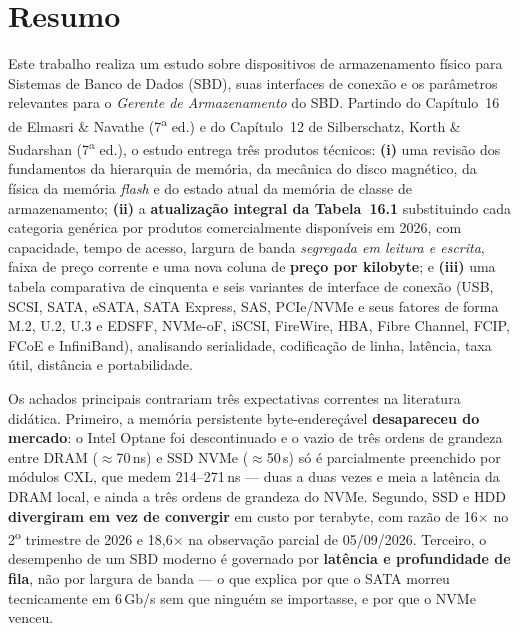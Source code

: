 \documentclass[11pt,a4paper]{article}
\begin{document}
\thispagestyle{empty}
\section*{Resumo}

Este trabalho realiza um estudo sobre dispositivos de armazenamento físico para Sistemas
de Banco de Dados (SBD), suas interfaces de conexão e os parâmetros relevantes para o
\emph{Gerente de Armazenamento} do SBD. Partindo do Capítulo~16 de Elmasri \& Navathe
(7\textsuperscript{a} ed.) e do Capítulo~12 de Silberschatz, Korth \& Sudarshan
(7\textsuperscript{a} ed.), o estudo entrega três produtos técnicos:
\textbf{(i)} uma revisão dos fundamentos da hierarquia de memória, da mecânica do disco
magnético, da física da memória \emph{flash} e do estado atual da memória de classe de
armazenamento; \textbf{(ii)} a \textbf{atualização integral da Tabela~16.1} substituindo
cada categoria genérica por produtos comercialmente disponíveis em 2026, com capacidade,
tempo de acesso, largura de banda \emph{segregada em leitura e escrita}, faixa de preço
corrente e uma nova coluna de \textbf{preço por kilobyte}; e \textbf{(iii)} uma tabela
comparativa de cinquenta e seis variantes de interface de conexão (USB, SCSI, SATA, eSATA,
SATA Express, SAS, PCIe/NVMe e seus fatores de forma M.2, U.2, U.3 e EDSFF, NVMe-oF, iSCSI,
FireWire, HBA, Fibre Channel, FCIP, FCoE e InfiniBand), analisando serialidade, codificação
de linha, latência, taxa útil, distância e portabilidade.

Os achados principais contrariam três expectativas correntes na literatura didática.
Primeiro, a memória persistente byte-endereçável \textbf{desapareceu do mercado}: o
Intel Optane foi descontinuado e o vazio de três ordens de grandeza entre DRAM
($\approx$70\,ns) e SSD NVMe ($\approx$50\,\textmu s) só é parcialmente preenchido por
módulos CXL, que medem 214--271\,ns --- duas a duas vezes e meia a latência da DRAM local, e
ainda a três ordens de grandeza do NVMe. Segundo, SSD e HDD \textbf{divergiram em vez de convergir} em custo por
terabyte, com razão de 16$\times$ no 2\textsuperscript{o} trimestre de 2026 e
18,6$\times$ na observação parcial de 05/09/2026. Terceiro, o desempenho de um
SBD moderno é governado por \textbf{latência e profundidade de fila}, não por largura de
banda --- o que explica por que o SATA morreu tecnicamente em 6\,Gb/s sem que ninguém se
importasse, e por que o NVMe venceu.
\end{document}
